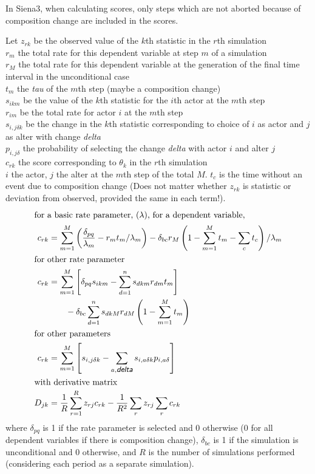 \documentclass[12pt,a4paper]{article}
\renewcommand{\=}{\,=\,}
\newcommand{\+}{\,+\,}
\newcommand{\nnm}[1]{\textsf{\small\textit{#1}}}
\newcommand{\Sn}{{\sf Siena3}}
\begin{document}
In \Sn, when calculating scores, only steps which are not aborted because of
composition change are included in the scores.

Let $z_{rk}$ be the observed value of the $k$th
statistic in the $r$th simulation\\
$r_m$ the total rate for this dependent variable at step $m$ of a simulation\\
$r_M$ the total rate for this dependent variable at the generation of the final
time interval in the unconditional case\\
$t_m$ the \nnm{tau} of the $m$th step (maybe a composition change)\\
$s_{ikm}$ be the value of the $k$th statistic for the $i$th actor at
the $m$th step\\
$r_{im}$ be the total rate for actor $i$ at the $m$th step\\
$s_{i,j\delta k}$ be the change in the $k$th statistic corresponding to
choice of $i$ as actor and $j$ as alter with change \nnm{delta}\\
$p_{i,j \delta }$ the probability of selecting the change \nnm{delta} with actor
$i$ and alter $j$\\
$c_{rk}$ the score corresponding to $\theta_k$ in the $r$th
simulation\\
$i$ the actor, $j$ the alter at the $m$th step of the total $M$.
$t_c$ is the time without an event due to composition change
(Does not matter
whether $z_{rk}$ is statistic or deviation from observed, provided the
same in each term!).
\begin{align*}
\intertext{for a basic rate parameter, $(\lambda)$, for a
dependent variable,}
c_{rk} &= \sum_{m=1}^M \left(
  \frac{\delta_{pq}}{\lambda_m} - r_m t_m / \lambda_m\right ) - \delta_{bc}
r_M  \left (1- \sum_{m=1}^M t_m - \sum_ct_c
  \right)/\lambda_m\\
\intertext{for other rate parameter}
c_{rk}&= \sum_{m=1}^M \left [\delta_{pq} s_{ikm}- \sum_{d=1}^n s_{dkm} r_{dm}t_m\right]\\
& \qquad - \delta_{bc}\sum_{d=1}^n s_{dkM}
r_{dM}\left (1- \sum_{m=1}^M t_m  \right)\\
\intertext{for other parameters}
c_{rk}&= \sum_{m=1}^M \left [ s_{i,j\delta k}- \sum_{a,\nnm{delta}}
  s_{i,a\delta k}p_{i,a\delta}\right]\\
\intertext{with derivative matrix}
 D_{jk}&=\frac{1}{R}\sum_{r=1}^R z_{rj}c_{rk}
 - \frac{1}{R^2}\sum_r z_{rj} \sum_r c_{rk}\\
\end{align*}
where $\delta_{pq}$ is 1 if the rate parameter is selected and 0 otherwise (0
for all dependent variables if there is composition change), $\delta_{bc}$ is 1
if the simulation is unconditional and 0 otherwise, and $R$ is the number of
simulations performed (considering each period as a separate simulation).
\end{document}
